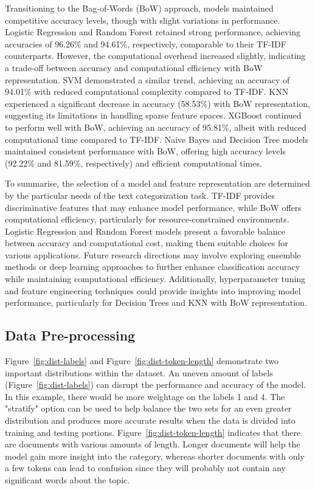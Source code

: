 Transitioning to the Bag-of-Words (BoW) approach, models maintained competitive accuracy levels, though with slight variations in performance. Logistic Regression and Random Forest retained strong performance, achieving accuracies of 96.26\% and 94.61\%, respectively, comparable to their TF-IDF counterparts. However, the computational overhead increased slightly, indicating a trade-off between accuracy and computational efficiency with BoW representation. SVM demonstrated a similar trend, achieving an accuracy of 94.01\% with reduced computational complexity compared to TF-IDF. KNN experienced a significant decrease in accuracy (58.53\%) with BoW representation, suggesting its limitations in handling sparse feature spaces. XGBoost continued to perform well with BoW, achieving an accuracy of 95.81\%, albeit with reduced computational time compared to TF-IDF. Naive Bayes and Decision Tree models maintained consistent performance with BoW, offering high accuracy levels (92.22\% and 81.59\%, respectively) and efficient computational times.

To summarise, the selection of a model and feature representation are determined by the particular needs of the text categorization task. TF-IDF provides discriminative features that may enhance model performance, while BoW offers computational efficiency, particularly for resource-constrained environments. Logistic Regression and Random Forest models present a favorable balance between accuracy and computational cost, making them suitable choices for various applications. Future research directions may involve exploring ensemble methods or deep learning approaches to further enhance classification accuracy while maintaining computational efficiency. Additionally, hyperparameter tuning and feature engineering techniques could provide insights into improving model performance, particularly for Decision Trees and KNN with BoW representation.

\subsection{Data Pre-processing}

Figure~\ref{fig:dist-labels} and Figure~\ref{fig:dist-token-length} demonstrate two important distributions within the dataset. An uneven amount of labels (Figure~\ref{fig:dist-labels}) can disrupt the performance and accuracy of the model. In this example, there would be more weightage on the labels 1 and 4. The "stratify" option can be used to help balance the two sets for an even greater distribution and produces more accurate results when the data is divided into training and testing portions. Figure~\ref{fig:dist-token-length} indicates that there are documents with various amounts of length. Longer documents will help the model gain more insight into the category, whereas shorter documents with only a few tokens can lead to confusion since they will probably not contain any significant words about the topic.

